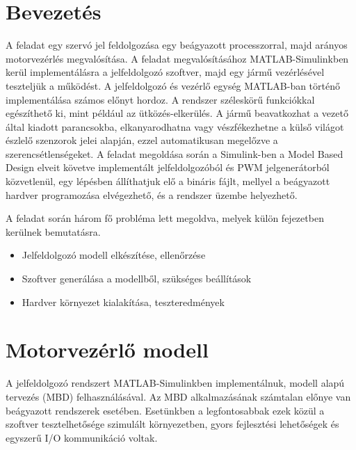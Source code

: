 \clearpage


\section{Bevezetés}

A feladat egy szervó jel feldolgozása egy beágyazott processzorral, majd arányos motorvezérlés megvalósítása. A feladat megvalósításához MATLAB-Simulinkben kerül implementálásra a jelfeldolgozó szoftver, majd egy jármű vezérlésével teszteljük a működést.
A jelfeldolgozó és vezérlő egység MATLAB-ban történő implementálása számos előnyt hordoz. A rendszer széleskörű funkciókkal egészíthető ki, mint például az ütközés-elkerülés. A jármű beavatkozhat a vezető által kiadott parancsokba, elkanyarodhatna vagy vészfékezhetne a külső világot észlelő szenzorok jelei alapján, ezzel automatikusan megelőzve a szerencsétlenségeket.
A feladat megoldása során a Simulink-ben a Model Based Design elveit követve implementált jelfeldolgozóból és PWM jelgenerátorból közvetlenül, egy lépésben állíthatjuk elő a bináris fájlt, mellyel a beágyazott hardver programozása elvégezhető, és a rendszer üzembe helyezhető.

A feladat során három fő probléma lett megoldva, melyek külön fejezetben kerülnek bemutatásra.
\begin{itemize}
	\item Jelfeldolgozó modell elkészítése, ellenőrzése
	\item Szoftver generálása a modellből, szükséges beállítások
	\item Hardver környezet kialakítása, teszteredmények
\end{itemize}

\section{Motorvezérlő modell}
A jelfeldolgozó rendszert MATLAB-Simulinkben implementálnuk, modell alapú tervezés (MBD) felhasználásával. Az MBD alkalmazásának számtalan előnye van beágyazott rendszerek esetében\cite{locomotive}. Esetünkben a legfontosabbak ezek közül a szoftver tesztelhetősége szimulált környezetben, gyors fejlesztési lehetőségek és egyszerű I/O kommunikáció voltak.

